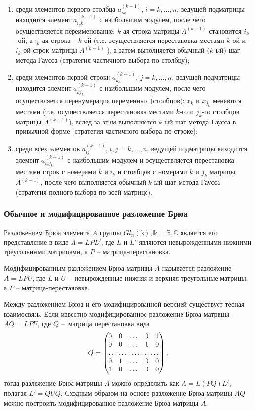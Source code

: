 \begin{enumerate}
	\item среди элементов первого столбца $a^{(k-1)}_{ik}$, $i = k, \hdots, n$, ведущей подматрицы находится элемент $a^{(k-1)}_{i_k k}$ с наибольшим модулем, после чего осуществляется переименование: $k$-ая строка матрицы $A^{ (k-1) }$ становится $i_k$-ой, а $i_k$-ая строка – $k$-ой (т.е. осуществляется перестановка местами $k$-ой и $i_k$-ой строк матрицы  $A^{ (k-1) }$ ), а затем выполняется обычный ($k$-ый) шаг метода Гаусса (стратегия частичного выбора по столбцу);
	\item среди элементов первой строки $a^{(k-1)}_{kj}$, $j = k, \hdots, n$, ведущей подматрицы находится элемент $a^{(k-1)}_{k j_k}$ с наибольшим модулем, после чего осуществляется перенумерация переменных (столбцов): $x_k$ и $x_{j_k}$ меняются местами (т.е. осуществляется перестановка местами $k$-го и $j_k$-го столбцов матрицы $A^{ (k-1) }$), вслед за этим выполняется $k$-ый шаг метода Гаусса в привычной форме (стратегия частичного выбора по строке);
	\item среди всех элементов $a^{(k-1)}_{ij}$, $i, j = k, \hdots, n$, ведущей подматрицы находится элемент $a^{(k-1)}_{i_k j_k}$ с наибольшим модулем и осуществляется перестановка местами строк с номерами $k$ и $i_k$ и столбцов с номерами $k$ и $j_k$ матрицы $A^{ (k-1) }$, после чего выполняется обычный $k$-ый шаг метода Гаусса (стратегия полного выбора по всей матрице).
\end{enumerate}


\subsubsection{Обычное и модифицированное разложение Брюа}

Разложением Брюа элемента $A$ группы $Gl_n(\mathbb{k}), \mathbb{k} = \mathbb{R}, \mathbb{C}$ является его представление в виде $A=LPL'$, где $L$ и $L'$ являются невырожденными нижними треугольными матрицами, а $P$ – матрица-перестановка. 

Модифицированным разложением Брюа матрицы $A$ называется разложение $A=LPU$, где $L$ и $U$ – невырожденные нижняя и верхняя треугольные матрицы, а $P$ – матрица-перестановка.

Между разложением Брюа и его модифицированной версией существует тесная взаимосвязь. Если известно модифицированное разложение Брюа матрицы $AQ=LPU$, где $Q$ – матрица перестановка вида
\[
Q = 
	\begin{pmatrix}
	0 & 0 & \dots & 0 & 1  \\
	0 & 0 & \dots & 1 & 0  \\
	\hdotsfor{5}           \\
	0 & 1 & \dots & 0 & 0  \\
	1 & 0 & \dots & 0 & 0  
	\end{pmatrix},
\]
тогда разложение Брюа матрицы $A$ можно определить как $A=L(PQ)L'$, полагая $L'=QUQ$. Сходным образом на основе разложение Брюа матрицы $AQ$ можно построить модифицированное разложение Брюа матрицы $A$.

